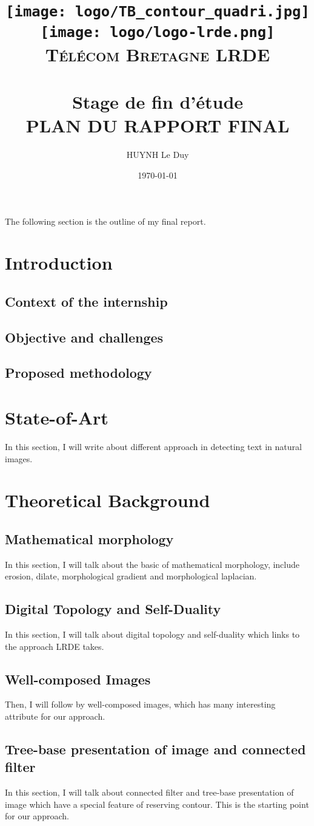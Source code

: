 \documentclass[12pt,a4paper]{article}
\title{	
\normalfont \normalsize
\hspace{1.5 cm}
\texttt{[image: logo/TB\_contour\_quadri.jpg]}
\hspace{10 cm}
\texttt{[image: logo/logo-lrde.png]} \\ [2pt]
\textsc{Télécom Bretagne} 
\hspace{9.5 cm}
\textsc{LRDE} \\ [25pt] %
\horrule{0.5pt} \\[0.4cm] %
\huge Stage de fin d'étude \\ %
\textsc{PLAN DU RAPPORT FINAL}
\horrule{2pt} \\[0.5cm] %
}
\author{HUYNH Le Duy} %
\date{\normalsize\today} %
\begin{document}
\maketitle %

The following section is the outline of my final report. 

\section{Introduction}
\subsection{Context of the internship}
\subsection{Objective and challenges}
\subsection{Proposed methodology}
\section{State-of-Art}
In this section, I will write about different approach in detecting text in natural images.
\section{Theoretical Background}
\subsection{Mathematical morphology}
In this section, I will talk about the basic of mathematical morphology, include erosion, dilate, morphological gradient and morphological laplacian.
\subsection{Digital Topology and Self-Duality}
In this section, I will talk about digital topology and self-duality which links to the approach LRDE takes.
\subsection{Well-composed Images}
Then, I will follow by well-composed images, which has many interesting attribute for our approach.
\subsection{Tree-base presentation of image and connected filter}
In this section, I will talk about connected filter and tree-base presentation of image which have a special feature of reserving contour. This is the starting point for our approach. 
\end{document}
